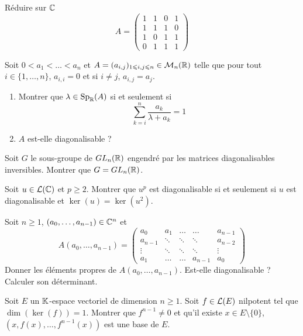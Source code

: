 \documentclass[12pt]{article}
\begin{document}
\begin{exercise}
	Réduire sur $\mathbb{C}$
	$$
	A=
	\begin{pmatrix}
		1 & 1 & 0 & 1\\
		1 & 1 & 1 & 0\\
		1 & 0 & 1 & 1\\
		0 & 1 & 1 & 1
	\end{pmatrix}
	$$
\end{exercise}

\begin{exercise}
	Soit $0<a_{1}<\dots<a_{n}$ et $A=(a_{i,j})_{1\leqslant i,j\leqslant n}\in\mathcal{M}_{n}(\mathbb{R})$ telle que pour tout $i\in\{1,\dots,n\}$, $a_{i,i}=0$ et si $i\neq j$, $a_{i,j}=a_{j}$.
	\begin{enumerate}
		\item Montrer que $\lambda\in\operatorname{Sp}_{\mathbb{R}}(A)$ si et seulement si 
		$$\sum_{k=i}^{n}\frac{a_{k}}{\lambda+a_{k}}=1$$
		\item $A$ est-elle diagonalisable ?
	\end{enumerate}
\end{exercise}

\begin{exercise}
	Soit $G$ le sous-groupe de $GL_{n}(\mathbb{R})$ engendré par les matrices diagonalisables inversibles. Montrer que $G=GL_{n}(\mathbb{R})$.
\end{exercise}

\begin{exercise}
	Soit $u\in\mathcal{L}(\mathbb{C})$ et $p\geqslant2$. Montrer que $u^{p}$ est diagonalisable si et seulement si $u$ est diagonalisable et $\ker(u)=\ker(u^{2})$.
\end{exercise}

\begin{exercise}
	Soit $n\geqslant 1$, $(a_{0},\dots,a_{n-1})\in\mathbb{C}^{n}$ et 
	$$
	A(a_{0},\dots,a_{n-1})=
	\begin{pmatrix}
		a_{0} & a_{1} & \dots & \dots & a_{n-1}\\
		a_{n-1} & \ddots & \ddots & \ddots & a_{n-2}\\
		\vdots & \ddots & \ddots & \ddots & \vdots\\
		a_{1} & \dots & \dots & a_{n-1} & a_{0}
	\end{pmatrix}
	$$
	Donner les éléments propres de $A(a_{0},\dots,a_{n-1})$. Est-elle diagonalisable ? Calculer son déterminant.
\end{exercise}

\begin{exercise}
	Soit $E$ un $\mathbb{K}$-espace vectoriel de dimension $n\geqslant1$. Soit $f\in\mathcal{L}(E)$ nilpotent tel que $\dim(\ker(f))=1$. Montrer que $f^{n-1}\neq 0$ et qu'il existe $x\in E\setminus\{0\}$, $(x,f(x),\dots,f^{n-1}(x))$ est une base de $E$.
\end{exercise}
\end{document}
